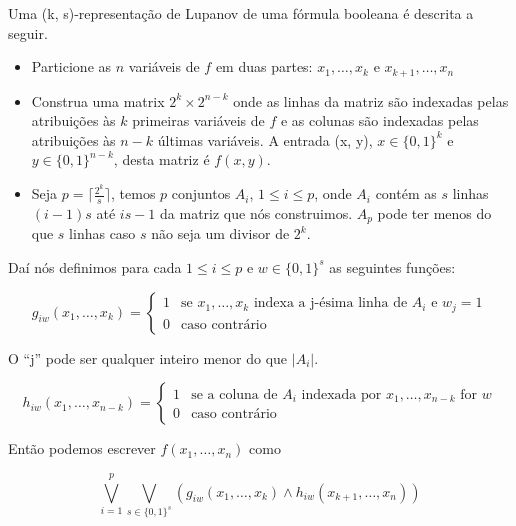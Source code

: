 
\begin{defi} 

Uma (k, s)-representação de Lupanov de uma fórmula booleana é descrita a seguir.

\begin{itemize}

\item Particione as $n$ variáveis de $f$ em duas partes: $x_{1}, \dots, x_{k}$ e $x_{k + 1}, \dots, x_{n}$

\item Construa uma matrix $2^{k} \times 2^{n - k}$ onde as linhas da matriz são indexadas pelas atribuições às $k$ primeiras variáveis de $f$ e as colunas são indexadas pelas atribuições às $n - k$ últimas variáveis. A entrada (x, y), $x \in \{0, 1\}^{k}$ e $y \in \{0, 1\}^{n- k}$, desta matriz é $f(x, y)$.

\item Seja $p = \lceil \frac{2^k}{s} \rceil$, temos $p$ conjuntos $A_{i}$, $1 \leq i \leq p$, onde $A_{i}$ contém as $s$ linhas $(i - 1)s$ até $is - 1$ da matriz que nós construimos. $A_{p}$ pode ter menos do que $s$ linhas caso $s$ não seja um divisor de $2^{k}$.

\end{itemize}

Daí nós definimos para cada $1 \leq i \leq p$ e $w \in \{0, 1\}^{s}$ as seguintes funções:

\begin{equation*}
    g_{iw}(x_{1}, \dots, x_{k}) = \begin{cases}
        1 & \text{se } x_{1}, \dots, x_{k} \text{ indexa a j-ésima linha de } A_{i} \text{ e } w_{j} = 1 \\
        0 & \text{caso contrário}
    \end{cases}
\end{equation*}

O ``j'' pode ser qualquer inteiro menor do que $\lvert A_{i} \rvert$.

\begin{equation*}
    h_{iw}(x_{1}, \dots, x_{n - k}) = \begin{cases}
        1 & \text{se a coluna de } A_{i} \text{ indexada por } x_{1}, \dots, x_{n - k} \text{ for } w \\
        0 & \text{caso contrário} 
    \end{cases}
\end{equation*}

Então podemos escrever $f(x_{1}, \dots, x_{n})$ como

\begin{equation} \label{eq:lupanov}
  \bigvee_{i = 1}^{p} \bigvee_{s \in \{0, 1\}^{s}} (g_{iw}(x_{1}, \dots, x_{k}) \land h_{iw}(x_{k + 1}, \dots, x_{n}))
\end{equation}

\end{defi}


